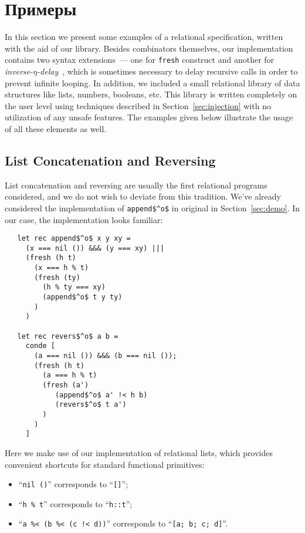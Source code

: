 \section{Примеры}
\label{sec:examples}

In this section we present some examples of a relational specification, written with the aid of our library.
Besides \miniKanren combinators themselves, our implementation contains two syntax extensions~--- one
for \lstinline|fresh| construct and another for \emph{inverse-$\eta$-delay}~\cite{MicroKanren}, which is
sometimes necessary to delay recursive calls in order to prevent infinite looping. In addition, we included a
small relational library of data structures like lists, numbers, booleans, etc. This library is written
completely on the user level using techniques described in Section~\ref{sec:injection} with no utilization
of any unsafe features. The examples given below illustrate the usage of all these elements as well.

\subsection{List Concatenation and Reversing}

List concatenation and reversing are usually the first relational programs considered, and we do not wish
to deviate from this tradition. We've already considered the implementation of \lstinline|append$^o$| in
original \miniKanren in Section~\ref{sec:demo}. In our case, the implementation looks familiar:

\begin{lstlisting}
   let rec append$^o$ x y xy =
     (x === nil ()) &&& (y === xy) |||
     (fresh (h t)
       (x === h % t)
       (fresh (ty)
         (h % ty === xy)
         (append$^o$ t y ty)
       )
     )

   let rec revers$^o$ a b =
     conde [
       (a === nil ()) &&& (b === nil ());
       (fresh (h t)
         (a === h % t)
         (fresh (a')
            (append$^o$ a' !< h b)
            (revers$^o$ t a')
         )
       )
     ]
\end{lstlisting}

Here we make use of our implementation of relational lists, which provides convenient shortcuts for
standard functional primitives:

\begin{itemize}
  \item ``\lstinline|nil ()|'' corresponds to ``\lstinline|[]|'';
  \item ``\lstinline|h % t|'' corresponds to ``\lstinline|h::t|'';
  \item ``\lstinline|a %< (b %< (c !< d))|'' corresponds to ``\lstinline|[a; b; c; d]|''.
\end{itemize}

